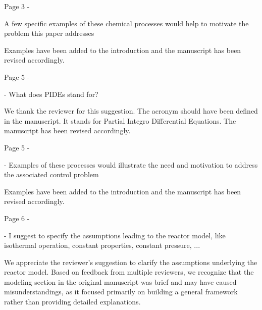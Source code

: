 \documentclass[12pt,answers]{exam}
\begin{document}
\begin{questions}

    \question Page 3 - 

    A few specific examples of these chemical processes would help to motivate the problem this paper addresses

    \begin{solutionorbox} \label{comment:1_1}
        Examples have been added to the introduction and the manuscript has been revised accordingly.
    \end{solutionorbox}

    \question Page 5 - 

    - What does PIDEs stand for?

    \begin{solutionorbox} \label{comment:1_2}
        We thank the reviewer for this suggestion. The acronym should have been defined in the manuscript. It stands for Partial Integro Differential Equations. The manuscript has been revised accordingly.
    \end{solutionorbox}


    \question Page 5 - 

    - Examples of these processes would illustrate the need and motivation to address the associated
    control problem

    \begin{solutionorbox} \label{comment:1_3}
        Examples have been added to the introduction and the manuscript has been revised accordingly.
    \end{solutionorbox}


    \question Page 6 - 

    - I suggest to specify the assumptions leading to the reactor model, like isothermal operation,
    constant properties, constant pressure, ...

    \begin{solutionorbox} \label{comment:1_4}
        We appreciate the reviewer’s suggestion to clarify the assumptions underlying the reactor model. Based on feedback from multiple reviewers, we recognize that the modeling section in the original manuscript was brief and may have caused misunderstandings, as it focused primarily on building a general framework rather than providing detailed explanations.


\end{solutionorbox}
\end{questions}
\end{document}
